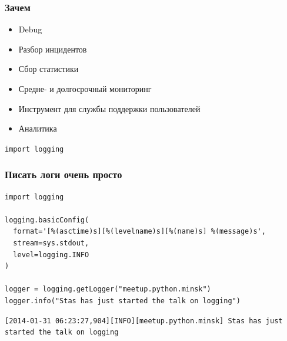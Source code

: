 \documentclass[aspectratio=169]{beamer}
\begin{document}
\begin{frame}
  \frametitle{Зачем}
  \begin{itemize}
    \item Debug
    \item Разбор инцидентов
      \pause
    \item Сбор статистики
    \item Средне- и долгосрочный мониторинг
    \item Инструмент для службы поддержки пользователей
    \item Аналитика
  \end{itemize}
\end{frame}


\begin{frame}
  \begin{center}
    {\Huge {\tt import logging}}
  \end{center}
\end{frame}


\begin{frame}[fragile]
  \frametitle{Писать логи очень просто}

  \begin{lstlisting}
import logging

logging.basicConfig(
  format='[%(asctime)s][%(levelname)s][%(name)s] %(message)s',
  stream=sys.stdout,
  level=logging.INFO
)

logger = logging.getLogger("meetup.python.minsk")
logger.info("Stas has just started the talk on logging")
  \end{lstlisting}

  \pause
  \vspace{1cm}

  \begin{lstlisting}
[2014-01-31 06:23:27,904][INFO][meetup.python.minsk] Stas has just started the talk on logging
  \end{lstlisting}
\end{frame}
\end{document}
